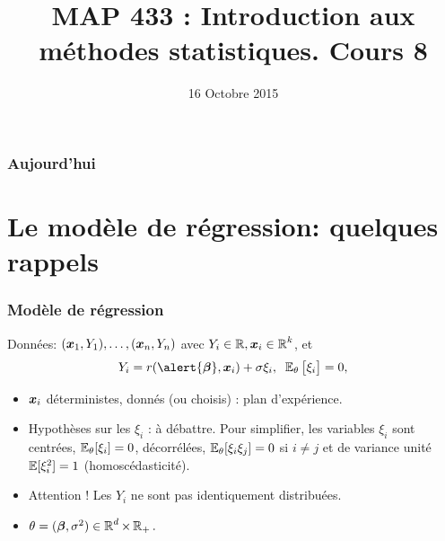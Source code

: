 


\title{MAP 433 : Introduction aux méthodes statistiques. Cours 8}

\date{16 Octobre 2015}
\maketitle



\begin{frame}
\frametitle{Aujourd'hui}
\tableofcontents
\end{frame}

\section{Le modèle de régression: quelques rappels}
\begin{frame}
\frametitle{Modèle de régression}
\begin{df}
Données: $(\operatorname{\boldsymbol{x}}_1,Y_1),\ldots, (\operatorname{\boldsymbol{x}}_n,Y_n)$ avec $Y_i \in \operatorname{{\mathbb R}}, \operatorname{\boldsymbol{x}}_i\in \operatorname{{\mathbb R}}^k$, et
$$Y_i =
r(\alert{\truebeta},\bx_i)+ \sigma \xi_i,\;\;\E_{\truetheta}\big[\xi_i\big]=0,
$$
\begin{itemize}
\item \alert<1>{$\operatorname{\boldsymbol{x}}_i$ déterministes, donnés (ou choisis) : plan d'expérience.}
\item \alert<2>{Hypothèses sur les $\xi_i$ : à débattre. \alert{Pour simplifier}, les variables $\xi_i$ sont centrées, $\operatorname{{\mathbb E}}_{\theta}[\xi_i]=0$,
décorrélées, $\operatorname{{\mathbb E}}_{\theta}[\xi_i \xi_j]= 0$ si $i \ne j$ et de variance unité $\operatorname{{\mathbb E}}[\xi_i^2]= 1$ \alert{ (homoscédasticité)}.}
\item \alert<3>{ Attention ! Les $Y_i$ ne sont pas identiquement distribuées.}
\item \alert<4>{$\theta= (\boldsymbol{\beta},\sigma^2) \in  \operatorname{{\mathbb R}}^d \times \operatorname{{\mathbb R}}_+.$}
\end{itemize}
\end{df}


\end{frame}

